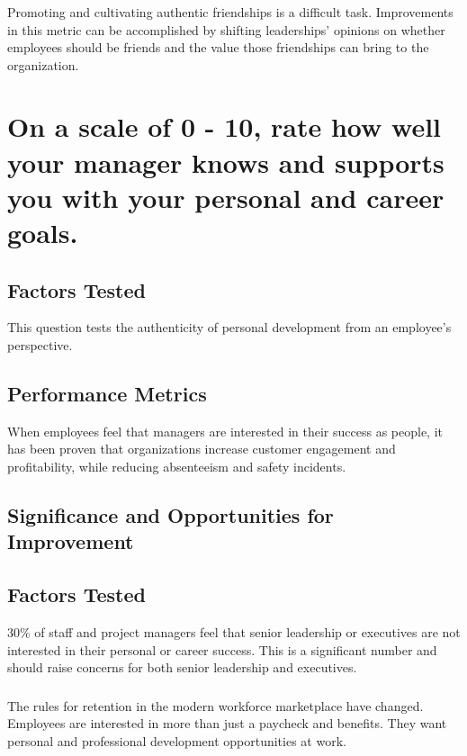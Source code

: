 \documentclass[14pt]{extreport}
\begin{document}
\subsubsection*{}
Promoting and cultivating authentic friendships is a difficult task. Improvements in this
metric can be accomplished by shifting leaderships' opinions on
whether employees should be friends and the value those
friendships can bring to the organization.

\newpage
\section*{On a scale of 0 - 10, rate how well your manager knows and supports you with your personal and career goals.}

\subsection*{\centering Factors Tested}
This question tests the authenticity of personal development
from an employee's perspective.
\subsection*{\centering Performance Metrics}
When employees feel that managers are interested in their
success as people, it has been proven that organizations
increase customer engagement and profitability, while reducing
absenteeism and safety incidents.
\newpage

\subsection*{\centering Significance and Opportunities for Improvement}
\subsection*{\centering Factors Tested}
30\% of staff and project managers feel that senior leadership or executives are not interested in their personal or career success. This is a significant number and should raise concerns for both senior leadership and executives.

\subsubsection*{}
The rules for retention in the modern workforce marketplace have changed. Employees are interested in more than just a paycheck and benefits. They want personal and professional development opportunities at work.
\end{document}
